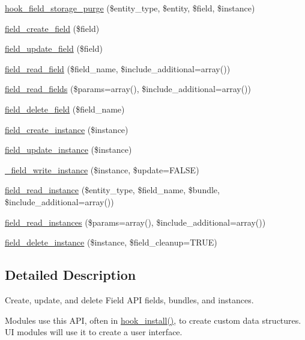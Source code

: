 \begin{DoxyCompactItemize}
\item 
\hyperlink{group__field__crud_gab26211d5d58698d2446bfd855f6137c9}{hook\_\-field\_\-storage\_\-purge} (\$entity\_\-type, \$entity, \$field, \$instance)
\item 
\hyperlink{group__field__crud_ga0f879889d2da2b5d638252d7eb027746}{field\_\-create\_\-field} (\$field)
\item 
\hyperlink{group__field__crud_gacca7d1f76963048aa84b1c9a271876f5}{field\_\-update\_\-field} (\$field)
\item 
\hyperlink{group__field__crud_ga65901c0b18f1d074852b3fb0ba93cabb}{field\_\-read\_\-field} (\$field\_\-name, \$include\_\-additional=array())
\item 
\hyperlink{group__field__crud_ga0dae5c311ea301668c8906d2711fb3c5}{field\_\-read\_\-fields} (\$params=array(), \$include\_\-additional=array())
\item 
\hyperlink{group__field__crud_gaa4792fd8f5f651b985dec7eca250f0f1}{field\_\-delete\_\-field} (\$field\_\-name)
\item 
\hyperlink{group__field__crud_ga3a1e23613d572a6e908e063c3a0335f8}{field\_\-create\_\-instance} (\$instance)
\item 
\hyperlink{group__field__crud_ga34a5c5247a19f6732f71aa1d67c1709d}{field\_\-update\_\-instance} (\$instance)
\item 
\hyperlink{group__field__crud_ga83dc14176ea710466ba351c1883074c9}{\_\-field\_\-write\_\-instance} (\$instance, \$update=FALSE)
\item 
\hyperlink{group__field__crud_ga7adc13c0c90428380e99dd3a0dd07737}{field\_\-read\_\-instance} (\$entity\_\-type, \$field\_\-name, \$bundle, \$include\_\-additional=array())
\item 
\hyperlink{group__field__crud_ga1d162c4a29778ee31d1d815324223ae6}{field\_\-read\_\-instances} (\$params=array(), \$include\_\-additional=array())
\item 
\hyperlink{group__field__crud_ga16bf0e2a15b20b066ff84403b5f24bf5}{field\_\-delete\_\-instance} (\$instance, \$field\_\-cleanup=TRUE)
\end{DoxyCompactItemize}


\subsection{Detailed Description}
Create, update, and delete Field API fields, bundles, and instances.

Modules use this API, often in \hyperlink{group__hooks_ga1ecdb5a2a046ea63dc790c3ed90338e5}{hook\_\-install()}, to create custom data structures. UI modules will use it to create a user interface.

